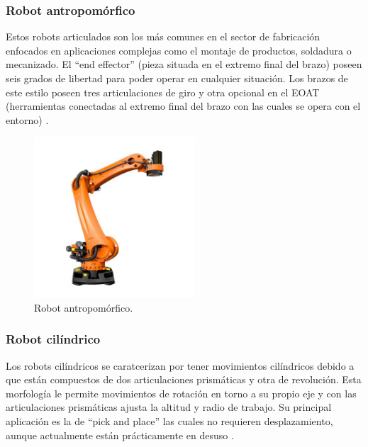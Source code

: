 \subsubsection{Robot antropomórfico}

Estos robots articulados son los más comunes en el sector de fabricación enfocados en aplicaciones complejas como el montaje de productos, soldadura o mecanizado. El ``end effector'' (pieza situada en el extremo final del brazo) poseen seis grados de libertad para poder operar en cualquier situación. Los brazos de este estilo poseen tres articulaciones de giro y otra opcional en el EOAT (herramientas conectadas al extremo final del brazo con las cuales se opera con el entorno) \cite{tipos_robots_2}.

\begin{figure} [h!]
  \begin{center}
    \includegraphics[width=6cm]{figs/robot_antropomorfico}
  \end{center}
  \caption{\centering Robot antropomórfico.}
  \label{fig:robot_antropomorfico}
\end{figure} 

\subsubsection{Robot cilíndrico}

Los robots cilíndricos se caratcerizan por tener movimientos cilíndricos debido a que están compuestos de dos articulaciones prismáticas y otra de revolución. Esta morfología le permite movimientos de rotación en torno a su propio eje y con las articulaciones prismáticas ajusta la altitud y radio de trabajo. Su principal aplicación es la de ``pick and place'' las cuales no requieren desplazamiento, aunque actualmente están prácticamente en desuso \cite{tipos_robots_2}.

